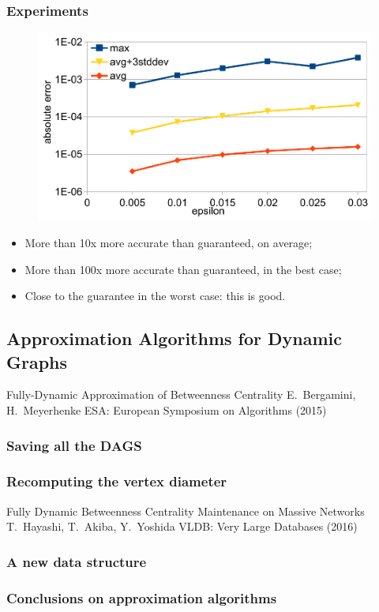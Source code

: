 \begin{frame}
  \frametitle{Experiments}
  \begin{figure}
    \includegraphics[width=\textwidth]{imgs/epinions-error.pdf}
  \end{figure}
  \begin{itemize}
    \item More than 10x more accurate than guaranteed, on average;
    \item More than 100x more accurate than guaranteed, in the best case;
    \item Close to the guarantee in the worst case: this is good.
  \end{itemize}
\end{frame}

\subsection{Approximation Algorithms for Dynamic Graphs}

\begin{frame}
  \centering
  \vfill
  {\huge Fully-Dynamic Approximation of Betweenness Centrality}
  \vfill
  {\Large E.~Bergamini, H.~Meyerhenke}
  \vfill
  {\large ESA: European Symposium on Algorithms (2015)}
  \vfill
\end{frame}

\begin{frame}
  \frametitle{Saving all the DAGS}
\end{frame}

\begin{frame}
  \frametitle{Recomputing the vertex diameter}
\end{frame}

\begin{frame}
  \centering
  \vfill
  {\huge Fully Dynamic Betweenness Centrality Maintenance on Massive
  Networks}
  \vfill
  {\Large T.~Hayashi, T.~Akiba, Y.~Yoshida}
  \vfill
  {\large VLDB: Very Large Databases (2016)}
  \vfill
\end{frame}

\begin{frame}
  \frametitle{A new data structure}
\end{frame}

\begin{frame}
  \frametitle{Conclusions on approximation algorithms}
\end{frame}
